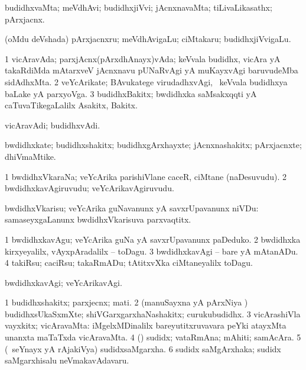\bentry
{}
\gl{\nA}
\bmng
budidhxvaMta; meVdhAvi; budidhxjiVvi; jAcnxnavaMta; tiLivaLikasathx; pArxjacnx. 
\emng

\noindent 
\gl{\pagu}
\bmng
{} (oMdu deVshada) pArxjacnxru; meVdhAvigaLu; ciMtakaru; budidhxjiVvigaLu. 
\emng
\eentry

\bentry
{}
\gl{\nA}
\bmng
\bnum
\num{1} vicAravAda; parxjAcnx(pArxdhAnayx)vAda; keVvala budidhx, vicAra yA takaRdiMda mAtarxveV jAcnxnavu pUNaRvAgi yA muKayxvAgi baruvudeMba sidAdhxMta. 
\num{2} veYcArikate; BAvukatege virudadhxvAgi, \kanmu\ keVvala budidhxya baLake yA parxyoVga. 
\num{3} budidhxBakitx; bwdidhxka saMsakxqqti yA caTuvaTikegaLalilx Asakitx, Bakitx. 
\enum
\emng
\eentry

\bentry
{}
\gl{\nA}
\bmng
vicAravAdi; budidhxvAdi. 
\emng
\eentry

\bentry
{}
\gl{\nA}
\bmng
bwdidhxkate; budidhxshakitx; budidhxgArxhayxte; jAcnxnashakitx; pArxjacnxte; dhiVmaMtike. 
\emng
\eentry

\bentry
{}
\gl{\nA}
\bmng
\bnum
\num{1} bwdidhxVkaraNa; veYcArika parishiVlane caceR, ciMtane (naDesuvudu). 
\num{2} bwdidhxkavAgiruvudu; veYcArikavAgiruvudu. 
\enum
\emng
\eentry

\bentry
{}
\gl{\sakirx}
\bmng
bwdidhxVkarisu; veYcArika guNavanunx yA savxrUpavanunx niVDu:  samaseyxgaLanunx bwdidhxVkarisuva parxvaqtitx. 
\emng

\noindent 
\gl{\akirx}
\bmng
\bnum
\num{1} bwdidhxkavAgu; veYcArika guNa yA savxrUpavanunx paDeduko. 
\num{2} bwdidhxka kirxyeyalilx, vAyxpAradalilx -- toDagu. 
\num{3} bwdidhxkavAgi -- bare yA mAtanADu. 
\num{4} takiRsu; caciRsu; takaRmADu; tAtitxvXka ciMtaneyalilx toDagu. 
\enum
\emng
\eentry

\bentry
{}
\gl{\kirxvi}
\bmng
bwdidhxkavAgi; veYcArikavAgi. 
\emng
\eentry

\bentry
{}
\gl{\nA}
\bmng
\bnum
\num{1} budidhxshakitx; parxjecnx; mati. 
\num{2} (manuSayxna yA pArxNiya \vi) budidhxsUkaSxmXte; shiVGarxgarxhaNashakitx; curukubudidhx. 
\num{3} vicArashiVla vayxkitx; vicAravaMta:  iMgelxMDinalilx bareyutitxruvavara peYki atayxMta unanxta maTaTxda vicAravaMta. 
\num{4} (\pArxparx) sudidx; vataRmAna; mAhiti; samAcAra. 
\num{5} (\kanmu\ seYnayx yA rAjakiVya) sudidxsaMgarxha. 
\num{6} sudidx saMgArxhaka; sudidx saMgarxhisalu neVmakavAdavaru. 
\enum
\emng
\eentry


